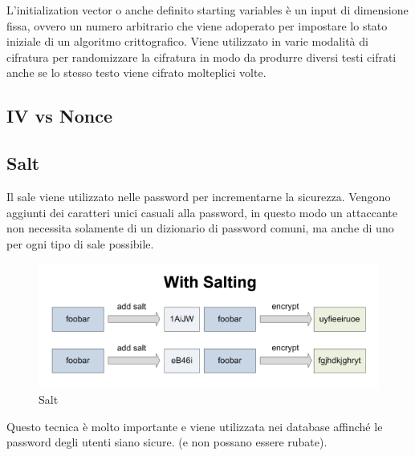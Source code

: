
\textsf{\small L'initialization vector o anche definito starting variables è un input di dimensione fissa, ovvero un numero arbitrario che viene adoperato per impostare lo stato iniziale di un algoritmo crittografico. Viene utilizzato in varie modalità di cifratura per randomizzare la cifratura in modo da produrre diversi testi cifrati anche se lo stesso testo viene cifrato molteplici volte.} %

\subsection{IV vs Nonce} %

\textsf{\small }

\subsection{Salt} %

\textsf{\small  Il sale viene utilizzato nelle password per incrementarne la sicurezza. Vengono aggiunti dei caratteri unici casuali alla password, in questo modo un attaccante non necessita solamente di un dizionario di password comuni, ma anche di uno per ogni tipo di sale possibile.} %

\begin{figure}[H]
	\centering
	\includegraphics[width=1\textwidth, height=1\textheight, keepaspectratio]{./images/iv_nonce_salt_pepper/withsalting.png}
	\caption{Salt}
	\label{fig:salt}
\end{figure}

\textsf{\small Questo tecnica è molto importante e viene utilizzata nei database affinché le password degli utenti siano sicure. (e non possano essere rubate).} %

